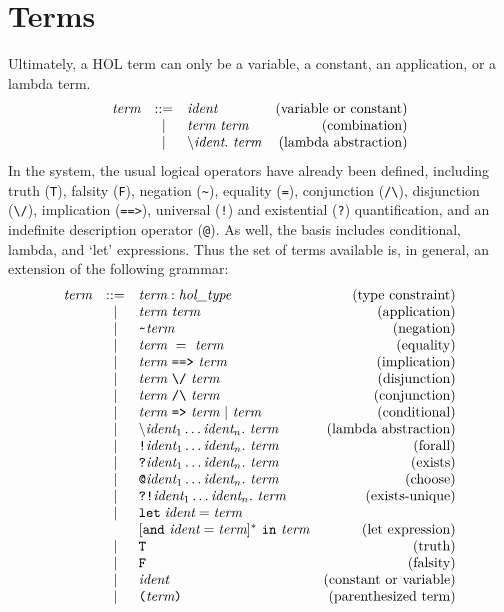  \section{Terms}

 Ultimately, a HOL term can only be a variable, a constant, an
 application, or a lambda term. 
 \[
 \begin{array}{rclr}
  \mbox{\it term} & ::= & \mbox{\it ident} & \mbox{(variable or constant)} \\
     & | &  \mbox{\it term}\  \mbox{\it term} & \mbox{(combination)} \\
     & | &  \mbox{$\backslash$}\mbox{\it ident}.\  \mbox{\it term} &
 \mbox{(lambda abstraction)}
 \end{array}
 \]
In the system, the usual logical operators have already been defined,
 including truth (\verb+T+), falsity (\verb+F+), negation (\verb+~+),
 equality (\verb+=+), conjunction (\verb+/\+), disjunction (\verb+\/+),
 implication (\verb+==>+), universal (\verb+!+) and existential
 (\verb+?+)  quantification, and an indefinite description operator
 (\verb+@+). As well, the basis includes conditional, lambda, and `let'
 expressions. Thus the set of terms available is, in general, an extension
 of the following grammar:
 \[
 \begin{array}{rclr}
  \mbox{\it term} & ::= & \term : \type & \mbox{(type constraint)} \\
  & | & \term\ \term & \mbox{(application)} \\
  & | & \verb+~+ \term & \mbox{(negation)} \\
  & | & \term\ =\ \term & \mbox{(equality)} \\
  & | & \term\ \IMP\ \term & \mbox{(implication)} \\
  & | & \term\ \verb+\/+\ \term & \mbox{(disjunction)} \\
  & | & \term\ \verb+/\+\ \term & \mbox{(conjunction)} \\
  & | & \term\ \verb+=>+\ \term\ |\ \term & \mbox{(conditional)} \\
  & | & \bs\ident_1\ldots\ident_n.\  \term & \mbox{(lambda abstraction)} \\
  & | & \ALL \ident_1\ldots\ident_n.\ \term & \mbox{(forall)} \\
  & | & \EXISTS \ident_1\ldots\ident_n.\ \term & \mbox{(exists)} \\
  & | & \CHOOSE \ident_1\ldots\ident_n.\ \term & \mbox{(choose)} \\
  & | & \EXISTSONE \ident_1\ldots\ident_n.\ \term &\mbox{(exists-unique)} \\
  & | & \LET\; \ident = \term  & \\
  &   & [\und\ \ident = \term]^{*}\ \IN\ \term & \mbox{(let expression)} \\
  & | & \verb+T+ & \mbox{(truth)} \\
  & | & \verb+F+ & \mbox{(falsity)} \\
  & | & \ident & \mbox{(constant or variable)} \\
  & | & \verb+(+ \term \verb+)+ & \mbox{(parenthesized term)}
 \end{array}
 \]

